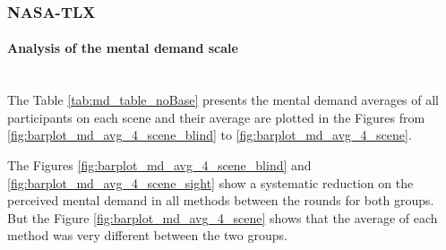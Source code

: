 \subsubsection{NASA-TLX}
\label{subsubsec:results_nasa_tlx_2}

\paragraph{Analysis of the mental demand scale}\mbox{}\\

The Table \ref{tab:md_table_noBase} presents the mental demand averages of all participants on each scene and their average are plotted in the Figures from \ref{fig:barplot_md_avg_4_scene_blind} to \ref{fig:barplot_md_avg_4_scene}. 



The Figures \ref{fig:barplot_md_avg_4_scene_blind} and \ref{fig:barplot_md_avg_4_scene_sight} show a systematic reduction on the perceived mental demand in all methods between the rounds for both groups. But the Figure \ref{fig:barplot_md_avg_4_scene} shows that the average of each method was very different between the two groups.

